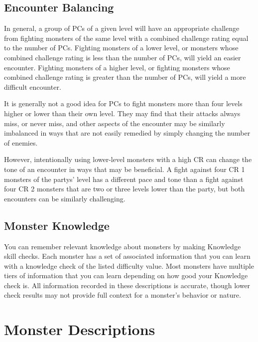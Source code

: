     \subsection{Encounter Balancing}\label{Encounter Balancing}
        In general, a group of PCs of a given level will have an appropriate challenge from fighting monsters of the same level with a combined challenge rating equal to the number of PCs.
        Fighting monsters of a lower level, or monsters whose combined challenge rating is less than the number of PCs, will yield an easier encounter.
        Fighting monsters of a higher level, or fighting monsters whose combined challenge rating is greater than the number of PCs, will yield a more difficult encounter.

        It is generally not a good idea for PCs to fight monsters more than four levels higher or lower than their own level.
        They may find that their attacks always miss, or never miss, and other aspects of the encounter may be similarly imbalanced in ways that are not easily remedied by simply changing the number of enemies.

        However, intentionally using lower-level monsters with a high CR can change the tone of an encounter in ways that may be beneficial.
        A fight against four CR 1 monsters of the partys' level has a different pace and tone than a fight against four CR 2 monsters that are two or three levels lower than the party, but both encounters can be similarly challenging.

    \subsection{Monster Knowledge}
        You can remember relevant knowledge about monsters by making Knowledge skill checks.
        Each monster has a set of associated information that you can learn with a knowledge check of the listed difficulty value.
        Most monsters have multiple tiers of information that you can learn depending on how good your Knowledge check is.
        All information recorded in these descriptions is accurate, though lower check results may not provide full context for a monster's behavior or nature.

\section{Monster Descriptions}


